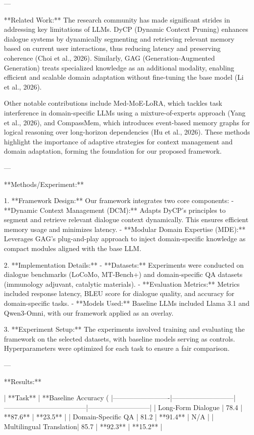 ---

**Related Work:**  
The research community has made significant strides in addressing key limitations of LLMs. DyCP (Dynamic Context Pruning) enhances dialogue systems by dynamically segmenting and retrieving relevant memory based on current user interactions, thus reducing latency and preserving coherence (Choi et al., 2026). Similarly, GAG (Generation-Augmented Generation) treats specialized knowledge as an additional modality, enabling efficient and scalable domain adaptation without fine-tuning the base model (Li et al., 2026).  

Other notable contributions include Med-MoE-LoRA, which tackles task interference in domain-specific LLMs using a mixture-of-experts approach (Yang et al., 2026), and CompassMem, which introduces event-based memory graphs for logical reasoning over long-horizon dependencies (Hu et al., 2026). These methods highlight the importance of adaptive strategies for context management and domain adaptation, forming the foundation for our proposed framework.  

---

**Methods/Experiment:**  

1. **Framework Design:**  
   Our framework integrates two core components:  
   - **Dynamic Context Management (DCM):** Adapts DyCP's principles to segment and retrieve relevant dialogue context dynamically. This ensures efficient memory usage and minimizes latency.  
   - **Modular Domain Expertise (MDE):** Leverages GAG's plug-and-play approach to inject domain-specific knowledge as compact modules aligned with the base LLM.  

2. **Implementation Details:**  
   - **Datasets:** Experiments were conducted on dialogue benchmarks (LoCoMo, MT-Bench+) and domain-specific QA datasets (immunology adjuvant, catalytic materials).  
   - **Evaluation Metrics:** Metrics included response latency, BLEU score for dialogue quality, and accuracy for domain-specific tasks.  
   - **Models Used:** Baseline LLMs included Llama 3.1 and Qwen3-Omni, with our framework applied as an overlay.  

3. **Experiment Setup:**  
   The experiments involved training and evaluating the framework on the selected datasets, with baseline models serving as controls. Hyperparameters were optimized for each task to ensure a fair comparison.  

---

**Results:**  

| **Task**                | **Baseline Accuracy (%
|-------------------------|---------------------------|------------------------------------|---------------------------|  
| Long-Form Dialogue      | 78.4                     | **87.6**                          | **23.5**                  |  
| Domain-Specific QA      | 81.2                     | **91.4**                          | N/A                       |  
| Multilingual Translation| 85.7                     | **92.3**                          | **15.2**                  |  

